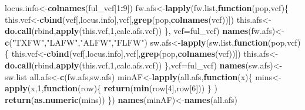 \documentclass[11pt,]{article}
\newenvironment{Shaded}{\begin{snugshade}}{\end{snugshade}}
\newcommand{\KeywordTok}[1]{\textcolor[rgb]{0.13,0.29,0.53}{\textbf{#1}}}
\newcommand{\DataTypeTok}[1]{\textcolor[rgb]{0.13,0.29,0.53}{#1}}
\newcommand{\DecValTok}[1]{\textcolor[rgb]{0.00,0.00,0.81}{#1}}
\newcommand{\StringTok}[1]{\textcolor[rgb]{0.31,0.60,0.02}{#1}}
\newcommand{\ControlFlowTok}[1]{\textcolor[rgb]{0.13,0.29,0.53}{\textbf{#1}}}
\newcommand{\OperatorTok}[1]{\textcolor[rgb]{0.81,0.36,0.00}{\textbf{#1}}}
\newcommand{\NormalTok}[1]{#1}
\begin{document}
\begin{Shaded}
\begin{Highlighting}[]
\NormalTok{locus.info<-}\KeywordTok{colnames}\NormalTok{(ful_vcf[}\DecValTok{1}\OperatorTok{:}\DecValTok{9}\NormalTok{])}
\NormalTok{fw.afs<-}\KeywordTok{lapply}\NormalTok{(fw.list,}\ControlFlowTok{function}\NormalTok{(pop,vcf)\{}
\NormalTok{  this.vcf<-}\KeywordTok{cbind}\NormalTok{(vcf[,locus.info],vcf[,}\KeywordTok{grep}\NormalTok{(pop,}\KeywordTok{colnames}\NormalTok{(vcf))])}
\NormalTok{  this.afs<-}\KeywordTok{do.call}\NormalTok{(rbind,}\KeywordTok{apply}\NormalTok{(this.vcf,}\DecValTok{1}\NormalTok{,calc.afs.vcf))}
\NormalTok{\}, }\DataTypeTok{vcf=}\NormalTok{ful_vcf)}
\KeywordTok{names}\NormalTok{(fw.afs)<-}\KeywordTok{c}\NormalTok{(}\StringTok{"TXFW"}\NormalTok{,}\StringTok{"LAFW"}\NormalTok{,}\StringTok{"ALFW"}\NormalTok{,}\StringTok{"FLFW"}\NormalTok{)}
\NormalTok{sw.afs<-}\KeywordTok{lapply}\NormalTok{(sw.list,}\ControlFlowTok{function}\NormalTok{(pop,vcf)\{}
\NormalTok{  this.vcf<-}\KeywordTok{cbind}\NormalTok{(vcf[,locus.info],vcf[,}\KeywordTok{grep}\NormalTok{(pop,}\KeywordTok{colnames}\NormalTok{(vcf))])}
\NormalTok{  this.afs<-}\KeywordTok{do.call}\NormalTok{(rbind,}\KeywordTok{apply}\NormalTok{(this.vcf,}\DecValTok{1}\NormalTok{,calc.afs.vcf))}
\NormalTok{\},}\DataTypeTok{vcf=}\NormalTok{ful_vcf)}
\KeywordTok{names}\NormalTok{(sw.afs)<-sw.list}
\NormalTok{all.afs<-}\KeywordTok{c}\NormalTok{(fw.afs,sw.afs)}
\NormalTok{minAF<-}\KeywordTok{lapply}\NormalTok{(all.afs,}\ControlFlowTok{function}\NormalTok{(x)\{}
\NormalTok{  mins<-}\KeywordTok{apply}\NormalTok{(x,}\DecValTok{1}\NormalTok{,}\ControlFlowTok{function}\NormalTok{(row)\{ }\KeywordTok{return}\NormalTok{(}\KeywordTok{min}\NormalTok{(row[}\DecValTok{4}\NormalTok{],row[}\DecValTok{6}\NormalTok{])) \} )}
  \KeywordTok{return}\NormalTok{(}\KeywordTok{as.numeric}\NormalTok{(mins))}
\NormalTok{\})}
\KeywordTok{names}\NormalTok{(minAF)<-}\KeywordTok{names}\NormalTok{(all.afs)}
\end{Highlighting}
\end{Shaded}
\end{document}
